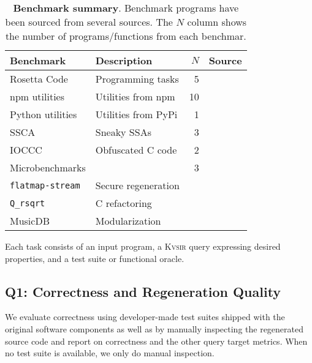 \documentclass[sigplan]{acmart}
\newcommand{\sys}{{\scshape Kv{\textalpha}sir}\xspace}
\newcommand{\ttt}[1]{\texttt{#1}}
\begin{document}
\begin{table}[h]
\centering
  \caption{\textbf{Benchmark summary}. 
  Benchmark programs have been sourced from several sources.
  The $N$ column shows the number of programs/functions from each benchmar.
  }
\begin{tabular}{llrl}
\toprule
Benchmark                                               & Description                    & $N$ & Source \\
\midrule
  Rosetta Code                                          & Programming tasks              & 5 & \cite{rosettacode} \\
  npm utilities                                           & Utilities from npm             & 10 & \cite{regbench2025} \\
Python utilities                                        & Utilities from PyPi            & 1 & \cite{regbench2025} \\
  SSCA                                                    & Sneaky SSAs    & 3 & \cite{ev:eurosec:2022, es1, ohm2020backstabber} \\
  IOCCC                                                   & Obfuscated C code              & 2 & \cite{ioccc} \\
Microbenchmarks                                         &          & 3    & \\
  \hspace{.5em} \ttt{flatmap-stream}                      & Secure regeneration            &      & \cite{es1}  \\
  \hspace{.5em} \ttt{Q_rsqrt}                             & C refactoring        &      & \cite{fast_inv_sqrt}  \\
  \hspace{.5em} \textsf{MusicDB}                          & Modularization           &      & \cite{codewithsadeemusicplayer} \\
\bottomrule
\end{tabular}
\label{tab:benchmarks}
\end{table}

Each task consists of an input program, a \sys query expressing desired properties, and a test suite or functional oracle.

\subsection{Q1: Correctness and Regeneration Quality}

We evaluate correctness using developer-made test suites 
shipped with the original software components as well as by manually inspecting
the regenerated source code and report on correctness and the other query target metrics.
When no test suite is available, we only do manual inspection.
\end{document}
